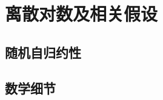 \section{离散对数及相关假设}\label{sec:10-5}

\subsection{随机自归约性}\label{subsec:10-5-1}

\subsection{数学细节}\label{subsec:10-5-2}